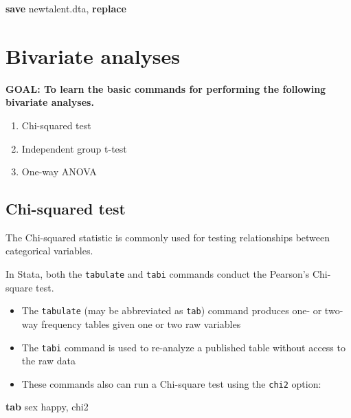 \documentclass[
]{book}
\newenvironment{Shaded}{\begin{snugshade}}{\end{snugshade}}
\newcommand{\FunctionTok}[1]{\textcolor[rgb]{0.00,0.00,0.00}{#1}}
\newcommand{\KeywordTok}[1]{\textcolor[rgb]{0.13,0.29,0.53}{\textbf{#1}}}
\newcommand{\NormalTok}[1]{#1}
\providecommand{\tightlist}{%
  \setlength{\itemsep}{0pt}\setlength{\parskip}{0pt}}
\begin{document}
\begin{Shaded}
\begin{Highlighting}[]
\KeywordTok{save}\NormalTok{ newtalent.dta, }\KeywordTok{replace} 
\end{Highlighting}
\end{Shaded}

\hypertarget{bivariate-analyses}{%
\section{Bivariate analyses}\label{bivariate-analyses}}

\textbf{GOAL: To learn the basic commands for performing the following bivariate analyses.}

\begin{enumerate}
\def\labelenumi{\arabic{enumi}.}
\tightlist
\item
  Chi-squared test
\item
  Independent group t-test
\item
  One-way ANOVA
\end{enumerate}

\hypertarget{chi-squared-test}{%
\subsection{Chi-squared test}\label{chi-squared-test}}

The Chi-squared statistic is commonly used for testing relationships between categorical variables.

In Stata, both the \texttt{tabulate} and \texttt{tabi} commands conduct the Pearson's Chi-square test.

\begin{itemize}
\tightlist
\item
  The \texttt{tabulate} (may be abbreviated as \texttt{tab}) command produces one- or two-way frequency tables given one or two raw variables
\item
  The \texttt{tabi} command is used to re-analyze a published table without access to the raw data
\item
  These commands also can run a Chi-square test using the \texttt{chi2} option:
\end{itemize}

\begin{Shaded}
\begin{Highlighting}[]
\KeywordTok{tab}\NormalTok{ sex happy, }\FunctionTok{chi2} 
\end{Highlighting}
\end{Shaded}
\end{document}
